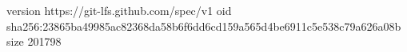 version https://git-lfs.github.com/spec/v1
oid sha256:23865ba49985ac82368da58b6f6dd6cd159a565d4be6911c5e538c79a626a08b
size 201798
